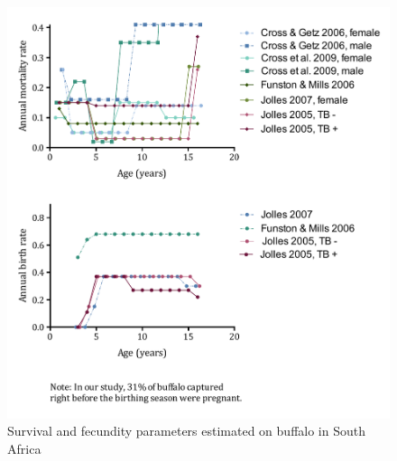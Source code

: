 \documentclass[letterpaper,12pt]{article}
\begin{document}
\begin{figure}
\begin{center}
\includegraphics[width=5.5in]{Figure3_parametersummary}
\end{center}
\caption{Survival and fecundity parameters estimated on buffalo in South Africa}
\label{fig3}
\end{figure}
\end{document}
